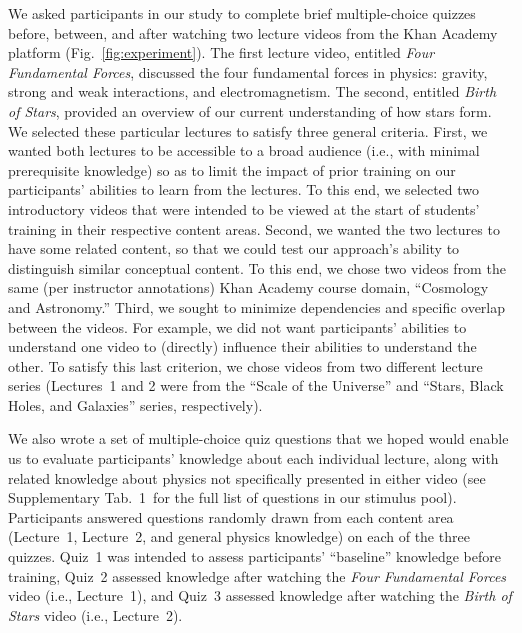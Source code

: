 \documentclass[10pt]{article}
\newcommand{\questions}{1}
\begin{document}
We asked participants in our study to complete brief multiple-choice quizzes
before, between, and after watching two lecture videos from the Khan
Academy~\citep{Khan04} platform (Fig.~\ref{fig:experiment}). The first lecture
video, entitled \textit{Four Fundamental Forces}, discussed the four
fundamental forces in physics: gravity, strong and weak interactions, and
electromagnetism. The second, entitled \textit{Birth of Stars}, provided an
overview of our current understanding of how stars form. We selected these
particular lectures to satisfy three general criteria. First, we wanted both
lectures to be accessible to a broad audience (i.e., with minimal prerequisite
knowledge) so as to limit the impact of prior training on our participants'
abilities to learn from the lectures. To this end, we selected two introductory
videos that were intended to be viewed at the start of students' training in
their respective content areas. Second, we wanted the two lectures to have some
related content, so that we could test our approach's ability to distinguish
similar conceptual content. To this end, we chose two videos from the same (per
instructor annotations) Khan Academy course domain, ``Cosmology and
Astronomy.'' Third, we sought to minimize dependencies and specific overlap
between the videos. For example, we did not want participants' abilities to
understand one video to (directly) influence their abilities to understand the
other. To satisfy this last criterion, we chose videos from two different
lecture series (Lectures~1 and 2 were from the ``Scale of the Universe'' and
``Stars, Black Holes, and Galaxies'' series, respectively).

We also wrote a set of multiple-choice quiz questions that we hoped would
enable us to evaluate participants' knowledge about each individual lecture,
along with related knowledge about physics not specifically presented in either
video (see Supplementary Tab.~\questions~for the full list of questions in our stimulus
pool). Participants answered questions randomly drawn from each content area
(Lecture~1, Lecture~2, and general physics knowledge) on each of the three
quizzes. Quiz~1 was intended to assess participants' ``baseline'' knowledge
before training, Quiz~2 assessed knowledge after watching the \textit{Four
Fundamental Forces} video (i.e., Lecture~1), and Quiz~3 assessed knowledge
after watching the \textit{Birth of Stars} video (i.e., Lecture~2).
\end{document}
